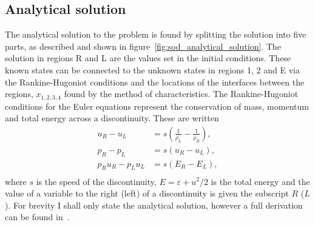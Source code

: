 \subsection{Analytical solution}

The analytical solution to the problem is found by splitting the solution into five parts, as described and shown in figure~\ref{fig:sod_analytical_solution}. The solution in regions R and L are the values set in the initial conditions. These known states can be connected to the unknown states in regions 1, 2 and E via the Rankine-Hugoniot conditions and the locations of the interfaces between the regions, $x_{1, 2, 3, 4}$ found by the method of characteristics. The Rankine-Hugoniot conditions for the Euler equations represent the conservation of mass, momentum and total energy across a discontinuity. These are written
\begin{equation}
  \label{eq:rk}
\begin{aligned}
  u_R - u_L &= s\left(\frac{1}{\rho_L} - \frac{1}{\rho_R}\right),\\
  p_R - p_L &= s(u_R - u_L),\\
  p_R u_R - p_L u_L &= s (E_R - E_L),\\
\end{aligned}
\end{equation}
where $s$ is the speed of the discontinuity, $E = \varepsilon + u^2/2$ is the total energy and the value of a variable to the right (left) of a discontinuity is given the subscript $R$ ($L$). For brevity I shall only state the analytical solution, however a full derivation can be found in~\cite{danailaIntroductionScientificComputing2006}.

